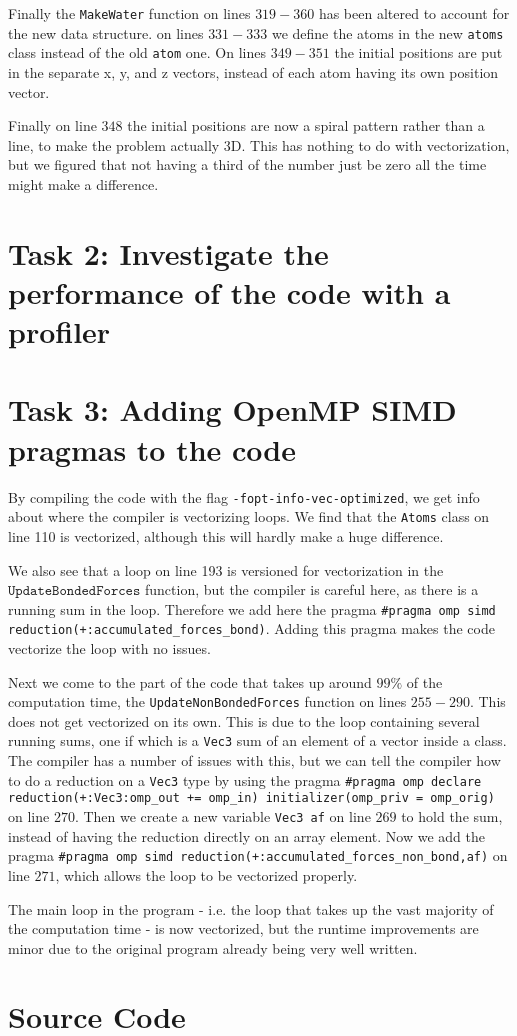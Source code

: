 \documentclass{article}
\begin{document}
Finally the \texttt{MakeWater} function on lines $319-360$ has been altered to account for the new data structure. on lines $331-333$ we define the atoms in the new \texttt{atoms} class instead of the old \texttt{atom} one. On lines $349-351$ the initial positions are put in the separate x, y, and z vectors, instead of each atom having its own position vector. 

Finally on line $348$ the initial positions are now a spiral pattern rather than a line, to make the problem actually 3D. This has nothing to do with vectorization, but we figured that not having a third of the number just be zero all the time might make a difference.

\section{Task 2: Investigate the performance of the code with a profiler}

\section{Task 3: Adding OpenMP SIMD pragmas to the code}
By compiling the code with the flag \texttt{-fopt-info-vec-optimized}, we get info about where the compiler is vectorizing loops. We find that the \texttt{Atoms} class on line 110 is vectorized, although this will hardly make a huge difference. 

We also see that a loop on line 193 is versioned for vectorization in the $\texttt{UpdateBondedForces}$ function, but the compiler is careful here, as there is a running sum in the loop. Therefore we add here the pragma \texttt{\#pragma omp simd reduction(+:accumulated\_forces\_bond)}. Adding this pragma makes the code vectorize the loop with no issues.

Next we come to the part of the code that takes up around $99\%$ of the computation time, the \texttt{UpdateNonBondedForces} function on lines $255-290$. This does not get vectorized on its own. This is due to the loop containing several running sums, one if which is a \texttt{Vec3} sum of an element of a vector inside a class. The compiler has a number of issues with this, but we can tell the compiler how to do a reduction on a \texttt{Vec3} type by using the pragma \texttt{\#pragma omp declare reduction(+:Vec3:omp\_out += omp\_in) initializer(omp\_priv = omp\_orig)} on line $270$. Then we create a new variable \texttt{Vec3 af} on line $269$ to hold the sum, instead of having the reduction directly on an array element. Now we add the pragma \texttt{\#pragma omp simd reduction(+:accumulated\_forces\_non\_bond,af)} on line $271$, which allows the loop to be vectorized properly. 

The main loop in the program - i.e. the loop that takes up the vast majority of the computation time - is now vectorized, but the runtime improvements are minor due to the original program already being very well written.

\section*{Source Code}

\end{document}
